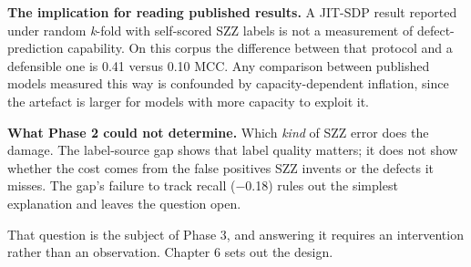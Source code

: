 \textbf{The implication for reading published results.} A JIT-SDP result
reported under random \emph{k}-fold with self-scored SZZ labels is not a
measurement of defect-prediction capability. On this corpus the
difference between that protocol and a defensible one is 0.41 versus
0.10 MCC. Any comparison between published models measured this way is
confounded by capacity-dependent inflation, since the artefact is larger
for models with more capacity to exploit it.

\textbf{What Phase 2 could not determine.} Which \emph{kind} of SZZ
error does the damage. The label-source gap shows that label quality
matters; it does not show whether the cost comes from the false
positives SZZ invents or the defects it misses. The gap's failure to
track recall (\ensuremath{-}0.18) rules out the simplest explanation and leaves the
question open.

That question is the subject of Phase 3, and answering it requires an
intervention rather than an observation. Chapter 6 sets out the design.
